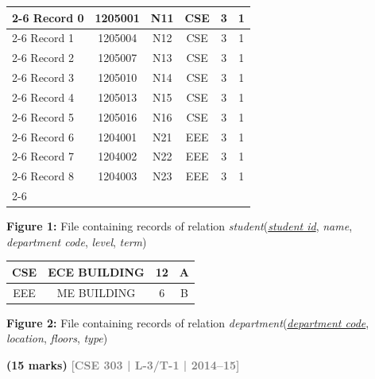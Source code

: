 \documentclass[12pt,a3paper]{article}
\newcommand{\yr}[1]{\hfill\textcolor{gray}{\small\textbf{[#1]}}}
\newcommand{\mk}[1]{\textcolor{orange!70!black}{\small\textbf{(#1 marks)}}}
\begin{document}
\begin{enumerate}
\begin{center}
  \renewcommand{\arraystretch}{1.3} %
    \begin{tabular}{l |c|c|c|c|c|}
        \cline{2-6}
        Record 0 & 1205001 & N11 & CSE & 3 & 1 \\
        \cline{2-6}
        Record 1 & 1205004 & N12 & CSE & 3 & 1 \\
        \cline{2-6}
        Record 2 & 1205007 & N13 & CSE & 3 & 1 \\
        \cline{2-6}
        Record 3 & 1205010 & N14 & CSE & 3 & 1 \\
        \cline{2-6}
        Record 4 & 1205013 & N15 & CSE & 3 & 1 \\
        \cline{2-6}
        Record 5 & 1205016 & N16 & CSE & 3 & 1 \\
        \cline{2-6}
        Record 6 & 1204001 & N21 & EEE & 3 & 1 \\
        \cline{2-6}
        Record 7 & 1204002 & N22 & EEE & 3 & 1 \\
        \cline{2-6}
        Record 8 & 1204003 & N23 & EEE & 3 & 1 \\
        \cline{2-6}
    \end{tabular}
    
    \vspace{0.4cm}
    \textbf{Figure 1:} File containing records of relation \textit{student}(\underline{\textit{student id}}, \textit{name}, \textit{department code}, \textit{level}, \textit{term})

\vspace{1cm}

    \renewcommand{\arraystretch}{1.3}
    \begin{tabular}{|c|c|c|c|}
        \hline
        CSE & ECE BUILDING & 12 & A \\
        \hline
        EEE & ME BUILDING & 6 & B \\
        \hline
    \end{tabular}
    
    \vspace{0.4cm}
    \textbf{Figure 2:} File containing records of relation \textit{department}(\underline{\textit{department code}}, \textit{location}, \textit{floors}, \textit{type})
\end{center}
\mk{15} \yr{CSE 303 | L-3/T-1 | 2014--15}


\end{enumerate}
\end{document}
